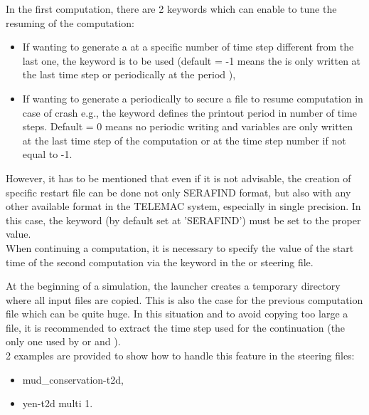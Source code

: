In the first computation, there are 2 keywords which can enable to tune the
resuming of the computation:
\begin{itemize}
\item If wanting to generate a  at a specific number of
time step different from the last one, the keyword
 is to be used
(default = -1 means the  is only written at the last
time step or periodically at the period ),
\item If wanting to generate a  periodically to secure a
file to resume computation in case of crash e.g., the keyword
 defines the printout period in number of
time steps.
Default = 0 means no periodic writing and variables are only written at the last
time step of the computation or at the time step number
 if not equal to -1.
\end{itemize}

However, it has to be mentioned that even if it is not advisable, the creation
of specific restart file can be done not only SERAFIND format, but also with
any other available format in the TELEMAC system, especially in single
precision. In this case, the keyword  (by default
set at 'SERAFIND') must be set to the proper value.
\\

When continuing a computation, it is necessary to specify the value of
the start time of the second computation via the keyword
 in the  or  steering
file.

At the beginning of a simulation, the launcher creates a temporary directory
where all input files are copied.
This is also the case for the previous computation file which can be quite huge.
In this situation and to avoid copying too large a file,
it is recommended to extract the time step used for the continuation
(the only one used by  or  and \gaia{}).
\\

2 examples are provided to show how to handle this feature in the steering
files:
\begin{itemize}
\item mud\_conservation-t2d,
\item yen-t2d multi 1.
\end{itemize}

